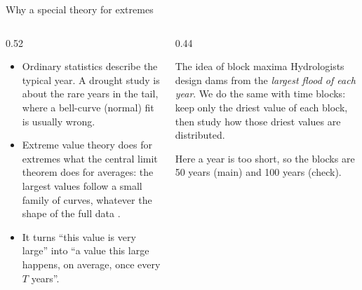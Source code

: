 \documentclass[aspectratio=169,11pt]{beamer}
\begin{document}
\begin{frame}{Why a special theory for extremes}
  \begin{columns}[T]
    \begin{column}{0.52\textwidth}\small
      \begin{itemize}\setlength{\itemsep}{3pt}
        \item Ordinary statistics describe the typical year. A drought study
              is about the rare years in the tail, where a bell-curve
              (normal) fit is usually wrong.
        \item Extreme value theory does for extremes what the central limit
              theorem does for averages: the largest values follow a small
              family of curves, whatever the shape of the full data
              \citep{Coles2001}.
        \item It turns ``this value is very large'' into ``a value this
              large happens, on average, once every $T$ years''.
      \end{itemize}
    \end{column}
    \begin{column}{0.44\textwidth}
      \begin{block}{The idea of block maxima}
        \small Hydrologists design dams from the \emph{largest flood of
        each year}. We do the same with time blocks: keep only the driest
        value of each block, then study how those driest values are
        distributed.
        \par\smallskip
        Here a year is too short, so the blocks are 50 years (main) and
        100 years (check).
      \end{block}
    \end{column}
  \end{columns}
\end{frame}
\end{document}
